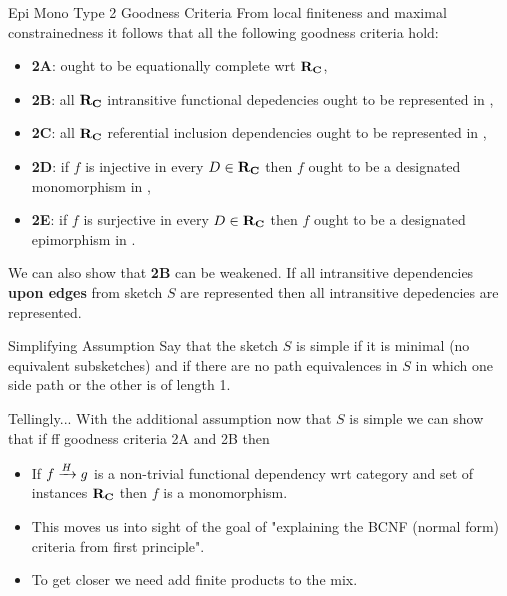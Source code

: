 \begin{frame}{Epi Mono Type 2 Goodness Criteria}
From local finiteness and maximal constrainedness it follows that all the following goodness criteria hold: 
\begin{itemize}
\item \textbf{2A}:  \catcw ought to be equationally complete wrt $\reqtc$,         
\item \textbf{2B}:  all $\reqtc$ intransitive functional depedencies ought to be represented in \catc,
\item \textbf{2C}:  all $\reqtc$ referential inclusion dependencies ought to be represented in \catc, 
\pause \item \textbf{2D}:  if $f$ is injective in every $D \in \reqtc$ then $f$ ought to be a designated monomorphism in \catc,
\pause \item \textbf{2E}:  if $f$ is surjective in every $D \in \reqtc$ then $f$ ought to be a designated epimorphism in \catc.
\end{itemize}
We can also show that \textbf{2B} can be weakened. If all intransitive dependencies \textbf{upon edges} from sketch $S$ are represented then 
all intransitive depedencies are represented.
\end{frame}

\begin{frame}{Simplifying Assumption}
Say that the sketch $S$ is simple if it is minimal (no equivalent subsketches) and if there are no path equivalences in $S$ in which one side path or the other is of length 1.  
\end{frame}


\begin{frame}{Tellingly...}
With the additional assumption now that $S$ is simple we can show that if
ff goodness criteria 2A and 2B then 
\begin{itemize}
\item If $\fundep{H}{f}{g}$ is a non-trivial   functional dependency wrt  category \catcw and set of instances $\reqtc$
 then $f$ is a monomorphism.

\item This moves us into sight of the goal of "explaining the BCNF (normal form) criteria from first principle". 

\item To get closer we need add finite products to the mix.
\end{itemize}
\end{frame}
